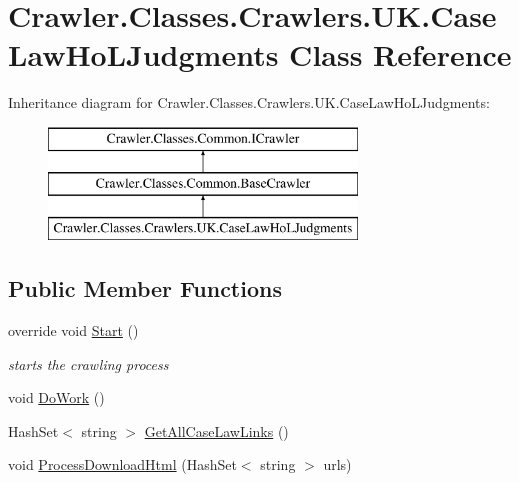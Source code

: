 \hypertarget{class_crawler_1_1_classes_1_1_crawlers_1_1_u_k_1_1_case_law_ho_l_judgments}{\section{Crawler.\-Classes.\-Crawlers.\-U\-K.\-Case\-Law\-Ho\-L\-Judgments Class Reference}
\label{class_crawler_1_1_classes_1_1_crawlers_1_1_u_k_1_1_case_law_ho_l_judgments}
}
Inheritance diagram for Crawler.\-Classes.\-Crawlers.\-U\-K.\-Case\-Law\-Ho\-L\-Judgments\-:\begin{figure}[H]
\begin{center}
\leavevmode
\includegraphics[height=3.000000cm]{class_crawler_1_1_classes_1_1_crawlers_1_1_u_k_1_1_case_law_ho_l_judgments}
\end{center}
\end{figure}
\subsection*{Public Member Functions}
\begin{DoxyCompactItemize}
\item 
override void \hyperlink{class_crawler_1_1_classes_1_1_crawlers_1_1_u_k_1_1_case_law_ho_l_judgments_ad73a34652655a6a9891dc78e4f76265b}{Start} ()
\begin{DoxyCompactList}\small\item\em starts the crawling process \end{DoxyCompactList}\item 
void \hyperlink{class_crawler_1_1_classes_1_1_crawlers_1_1_u_k_1_1_case_law_ho_l_judgments_abab5f5a25c775619a73c36b183291af8}{Do\-Work} ()
\item 
Hash\-Set$<$ string $>$ \hyperlink{class_crawler_1_1_classes_1_1_crawlers_1_1_u_k_1_1_case_law_ho_l_judgments_a2e2b02c782028fa876cc55c6fa9859ee}{Get\-All\-Case\-Law\-Links} ()
\item 
void \hyperlink{class_crawler_1_1_classes_1_1_crawlers_1_1_u_k_1_1_case_law_ho_l_judgments_a9a818f1ee7742897c9b599b6b74ce51e}{Process\-Download\-Html} (Hash\-Set$<$ string $>$ urls)
\end{DoxyCompactItemize}
